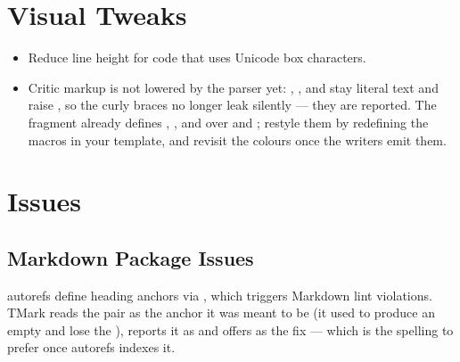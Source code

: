 \documentclass[a4paper,twoside]{article}
\begin{document}
\section{Visual Tweaks}
\begin{itemize}
\item Reduce line height for code that uses Unicode box characters.
\item Critic markup is not lowered by the parser yet: ,
,  and  stay literal text and
raise , so the curly braces no longer leak silently ---
they are reported. The  fragment already defines ,
,  and  over  and ; restyle
them by redefining the macros in your template, and revisit the colours once
the writers emit them.
\end{itemize}
\section{Issues}
\subsection{Markdown Package Issues}
 autorefs define heading anchors via , which triggers Markdown lint violations. TMark reads the pair as the anchor it was meant to be (it used to produce an empty  and lose the ), reports it as  and offers  as the fix --- which is the spelling to prefer once autorefs indexes it.
\end{document}
